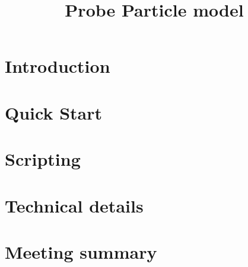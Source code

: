 \documentclass[english]{book}
\title{Probe Particle model}
\author{}
\begin{document}
\maketitle

\tableofcontents

\chapter{Introduction}


\chapter{Quick Start}


\chapter{Scripting}


\chapter{Technical details}


\chapter{Meeting summary}




\newpage



\end{document}
